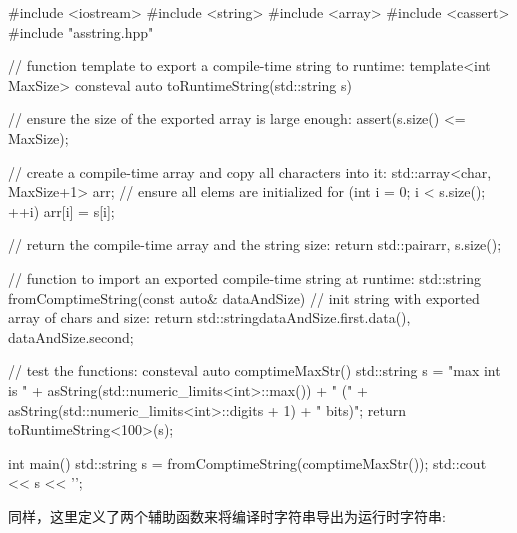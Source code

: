 
\begin{cpp}
#include <iostream>
#include <string>
#include <array>
#include <cassert>
#include "asstring.hpp"

// function template to export a compile-time string to runtime:
template<int MaxSize>
consteval auto toRuntimeString(std::string s)
{
	// ensure the size of the exported array is large enough:
	assert(s.size() <= MaxSize);
	
	// create a compile-time array and copy all characters into it:
	std::array<char, MaxSize+1> arr{}; // ensure all elems are initialized
	for (int i = 0; i < s.size(); ++i) {
		arr[i] = s[i];
	}
	
	// return the compile-time array and the string size:
	return std::pair{arr, s.size()};
}

// function to import an exported compile-time string at runtime:
std::string fromComptimeString(const auto& dataAndSize)
{
	// init string with exported array of chars and size:
	return std::string{dataAndSize.first.data(),
					   dataAndSize.second};
}

// test the functions:
consteval auto comptimeMaxStr()
{
	std::string s = "max int is " + asString(std::numeric_limits<int>::max())
					+ " (" + asString(std::numeric_limits<int>::digits + 1)
					+ " bits)";
	return toRuntimeString<100>(s);
}

int main()
{
	std::string s = fromComptimeString(comptimeMaxStr());
	std::cout << s << '\n';
}
\end{cpp}

同样，这里定义了两个辅助函数来将编译时字符串导出为运行时字符串:

